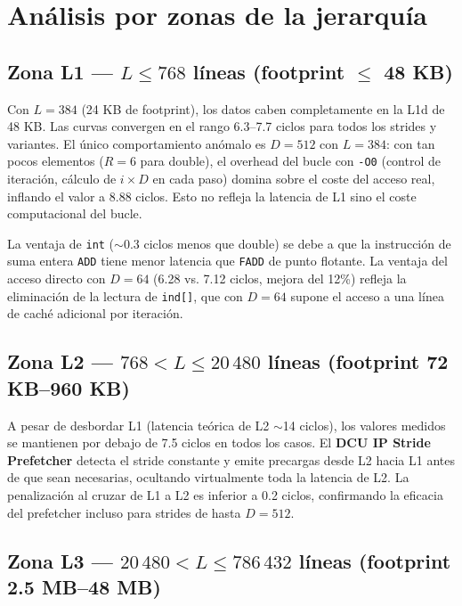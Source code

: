 \documentclass[12pt,a4paper]{article}
\begin{document}
\section{Análisis por zonas de la jerarquía}

\subsection{Zona L1 --- $L \leq 768$ líneas (footprint $\leq$ 48 KB)}

Con $L=384$ (24 KB de footprint), los datos caben completamente en la L1d de 48 KB.
Las curvas convergen en el rango 6.3--7.7 ciclos para todos los strides y variantes.
El único comportamiento anómalo es $D=512$ con $L=384$: con tan pocos elementos ($R=6$ para double), el overhead del bucle con \texttt{-O0} (control de iteración, cálculo de $i \times D$ en cada paso) domina sobre el coste del acceso real, inflando el valor a 8.88 ciclos.
Esto no refleja la latencia de L1 sino el coste computacional del bucle.

La ventaja de \texttt{int} ($\sim$0.3 ciclos menos que double) se debe a que la instrucción de suma entera \texttt{ADD} tiene menor latencia que \texttt{FADD} de punto flotante.
La ventaja del acceso directo con $D=64$ (6.28 vs. 7.12 ciclos, mejora del 12\%) refleja la eliminación de la lectura de \texttt{ind[]}, que con $D=64$ supone el acceso a una línea de caché adicional por iteración.

\subsection{Zona L2 --- $768 < L \leq 20\,480$ líneas (footprint 72 KB--960 KB)}

A pesar de desbordar L1 (latencia teórica de L2 $\sim$14 ciclos), los valores medidos se mantienen por debajo de 7.5 ciclos en todos los casos.
El \textbf{DCU IP Stride Prefetcher} detecta el stride constante y emite precargas desde L2 hacia L1 antes de que sean necesarias, ocultando virtualmente toda la latencia de L2.
La penalización al cruzar de L1 a L2 es inferior a 0.2 ciclos, confirmando la eficacia del prefetcher incluso para strides de hasta $D=512$.

\subsection{Zona L3 --- $20\,480 < L \leq 786\,432$ líneas (footprint 2.5 MB--48 MB)}
\end{document}
